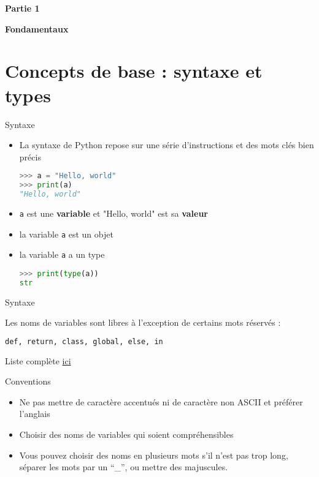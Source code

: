 \begin{frame}{}
  \centering
  \Large
  \textbf{Partie 1}

  \textbf{Fondamentaux}
\end{frame}

\section{Concepts de base : syntaxe et types}

\begin{frame}[fragile]{Syntaxe}
  
  \begin{itemize}
    \item<+->[\textcolor{white}{a}] La syntaxe de Python repose sur une série d'instructions et des mots clés bien précis
\begin{lstlisting}[language=Python, morekeywords={as, TypeError}, numbers=none]
>>> a = "Hello, world"
>>> print(a)
"Hello, world"
\end{lstlisting}
    \item<+-> \texttt{a} est une \textbf{variable} et "Hello, world" est sa \textbf{valeur}
    \item<+-> la variable \texttt{a} est un objet
    \item<+-> la variable \texttt{a} a un type
\begin{lstlisting}[language=Python, morekeywords={as, TypeError}, numbers=none]
>>> print(type(a))
str
\end{lstlisting}
  \end{itemize}
\end{frame}

\begin{frame}[fragile]{Syntaxe}

  Les noms de variables sont libres à l'exception de certains mots réservés :

\begin{lstlisting}[language=bash, morekeywords={def, list, class, global, else, in}, numbers=none]
def, return, class, global, else, in
\end{lstlisting}

Liste complète \href{https://docs.python.org/3/reference/lexical\_analysis.html\#keywords}{ici}

\begin{block}{Conventions}
  \begin{itemize}
    \item Ne pas mettre de caractère accentués ni de caractère non ASCII et préférer l'anglais
    \item Choisir des noms de variables qui soient compréhensibles
    \item Vous pouvez choisir des noms en plusieurs mots s'il n'est pas trop long, séparer les mots par un ``\_'', ou mettre des majuscules.
  \end{itemize}
\end{block}
\end{frame}

